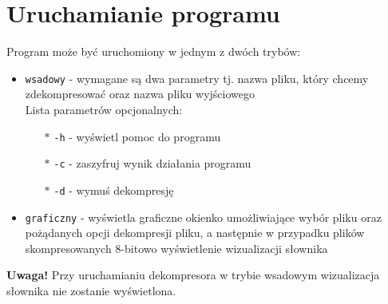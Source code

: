 \documentclass[]{article}
\begin{document}
\section{Uruchamianie programu}\label{header-n256}

Program może być uruchomiony w jednym z dwóch trybów:
\begin{itemize}
\item
    \texttt{wsadowy} - wymagane są dwa parametry tj. nazwa pliku, który chcemy zdekompresować oraz nazwa pliku wyjściowego 
    \\Lista parametrów opcjonalnych:

    \begin{itemize}
    \item[$\ast$]
     \texttt{-h} - wyświetl pomoc do programu
    \item[$\ast$]
     \texttt{-c} - zaszyfruj wynik działania programu
    \item[$\ast$]
     \texttt{-d} - wymuś dekompresję
    \end{itemize}
\item
    \texttt{graficzny} - wyświetla graficzne okienko umożliwiające wybór pliku oraz pożądanych opcji dekompresji pliku, a następnie w przypadku plików skompresowanych 8-bitowo wyświetlenie wizualizacji słownika
\end{itemize}

\textbf{Uwaga!} Przy uruchamianiu dekompresora w trybie wsadowym wizualizacja słownika nie zostanie wyświetlona.
\end{document}

